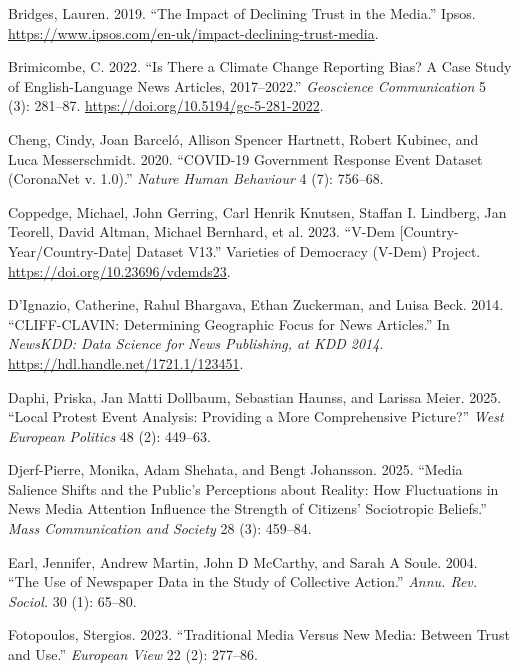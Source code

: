 \documentclass[
  letterpaper,
  DIV=11,
  numbers=noendperiod]{scrartcl}
\newlength{\cslhangindent}
\newlength{\cslentryspacingunit} %
\newenvironment{CSLReferences}[2] %
 {%
  \setlength{\parindent}{0pt}
  \ifodd #1
  \let\oldpar\par
  \def\par{\hangindent=\cslhangindent\oldpar}
  \fi
  \setlength{\parskip}{#2\cslentryspacingunit}
 }%
 {}
\begin{document}
\begin{CSLReferences}{1}{0}
\leavevmode{}%
Bridges, Lauren. 2019. {``The Impact of Declining Trust in the Media.''}
Ipsos. \url{https://www.ipsos.com/en-uk/impact-declining-trust-media}.

\leavevmode{}%
Brimicombe, C. 2022. {``Is There a Climate Change Reporting Bias? A Case
Study of English-Language News Articles, 2017--2022.''} \emph{Geoscience
Communication} 5 (3): 281--87.
\url{https://doi.org/10.5194/gc-5-281-2022}.

\leavevmode{}%
Cheng, Cindy, Joan Barceló, Allison Spencer Hartnett, Robert Kubinec,
and Luca Messerschmidt. 2020. {``COVID-19 Government Response Event
Dataset (CoronaNet v. 1.0).''} \emph{Nature Human Behaviour} 4 (7):
756--68.

\leavevmode{}%
Coppedge, Michael, John Gerring, Carl Henrik Knutsen, Staffan I.
Lindberg, Jan Teorell, David Altman, Michael Bernhard, et al. 2023.
{``V-Dem {[}Country-Year/Country-Date{]} Dataset V13.''} Varieties of
Democracy (V-Dem) Project. \url{https://doi.org/10.23696/vdemds23}.

\leavevmode{}%
D'Ignazio, Catherine, Rahul Bhargava, Ethan Zuckerman, and Luisa Beck.
2014. {``CLIFF-CLAVIN: Determining Geographic Focus for News
Articles.''} In \emph{NewsKDD: Data Science for News Publishing, at KDD
2014}. \url{https://hdl.handle.net/1721.1/123451}.

\leavevmode{}%
Daphi, Priska, Jan Matti Dollbaum, Sebastian Haunss, and Larissa Meier.
2025. {``Local Protest Event Analysis: Providing a More Comprehensive
Picture?''} \emph{West European Politics} 48 (2): 449--63.

\leavevmode{}%
Djerf-Pierre, Monika, Adam Shehata, and Bengt Johansson. 2025. {``Media
Salience Shifts and the Public's Perceptions about Reality: How
Fluctuations in News Media Attention Influence the Strength of Citizens'
Sociotropic Beliefs.''} \emph{Mass Communication and Society} 28 (3):
459--84.

\leavevmode{}%
Earl, Jennifer, Andrew Martin, John D McCarthy, and Sarah A Soule. 2004.
{``The Use of Newspaper Data in the Study of Collective Action.''}
\emph{Annu. Rev. Sociol.} 30 (1): 65--80.

\leavevmode{}%
Fotopoulos, Stergios. 2023. {``Traditional Media Versus New Media:
Between Trust and Use.''} \emph{European View} 22 (2): 277--86.


\end{CSLReferences}
\end{document}
